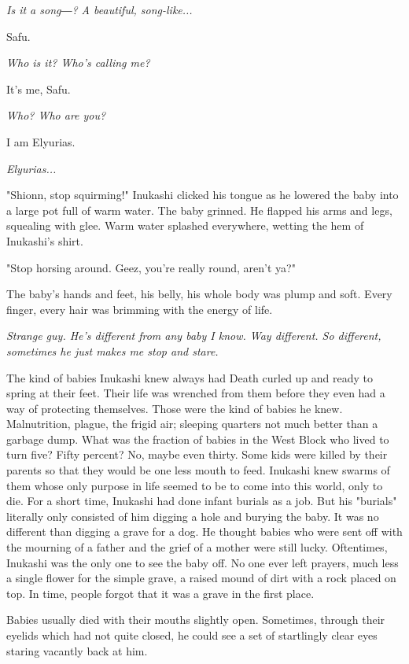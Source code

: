 \emph{Is it a song―? A beautiful, song-like...}

Safu.

\emph{Who is it? Who's calling me?}

It's me, Safu.

\emph{Who? Who are you?}

I am Elyurias.

\emph{Elyurias...}

\mybreak

"Shionn, stop squirming!" Inukashi clicked his tongue as he lowered the
baby into a large pot full of warm water. The baby grinned. He flapped
his arms and legs, squealing with glee. Warm water splashed everywhere,
wetting the hem of Inukashi's shirt.

"Stop horsing around. Geez, you're really round, aren't ya?"

The baby's hands and feet, his belly, his whole body was plump and soft.
Every finger, every hair was brimming with the energy of life.

\emph{Strange guy. He's different from any baby I know. Way different. So
different, sometimes he just makes me stop and stare.}

The kind of babies Inukashi knew always had Death curled up and ready to
spring at their feet. Their life was wrenched from them before they even
had a way of protecting themselves. Those were the kind of babies he
knew. Malnutrition, plague, the frigid air; sleeping quarters not much
better than a garbage dump. What was the fraction of babies in the West
Block who lived to turn five? Fifty percent? No, maybe even thirty. Some
kids were killed by their parents so that they would be one less mouth
to feed. Inukashi knew swarms of them whose only purpose in life seemed
to be to come into this world, only to die. For a short time, Inukashi
had done infant burials as a job. But his "burials" literally only
consisted of him digging a hole and burying the baby. It was no
different than digging a grave for a dog. He thought babies who were
sent off with the mourning of a father and the grief of a mother were
still lucky. Oftentimes, Inukashi was the only one to see the baby off.
No one ever left prayers, much less a single flower for the simple
grave, a raised mound of dirt with a rock placed on top. In time, people
forgot that it was a grave in the first place.

Babies usually died with their mouths slightly open. Sometimes, through
their eyelids which had not quite closed, he could see a set of
startlingly clear eyes staring vacantly back at him.

